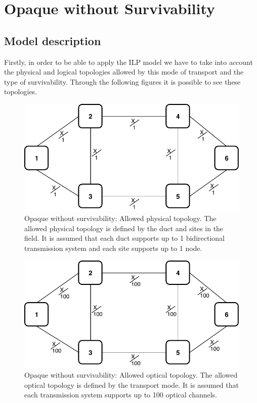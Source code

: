 \clearpage

\section{Opaque without Survivability}\label{ILP_Opaque_Survivability}

\subsection{Model description}

Firstly, in order to be able to apply the ILP model we have to take into account the physical and logical topologies allowed by this mode of transport and the type of survivability. Through the following figures it is possible to see these topologies.\\

\begin{figure}[h!]
\centering
\includegraphics[width=12cm]{sdf/ilp/opaque_survivability/figures/allowed_physical_topology}
\caption{Opaque without survivability: Allowed physical topology. The allowed physical topology is defined by the duct and sites in the field. It is assumed that each duct supports up to 1 bidirectional transmission system and each site supports up to 1 node.}
\label{allowed_physical_low}
\end{figure}

\vspace{13pt}
\begin{figure}[h!]
\centering
\includegraphics[width=12cm]{sdf/ilp/opaque_survivability/figures/allowed_optical_topology}
\caption{Opaque without survivability: Allowed optical topology. The allowed optical topology is defined by the transport mode. It is assumed that each transmission system supports up to 100 optical channels.}
\label{allowed_optical_low}
\end{figure}

